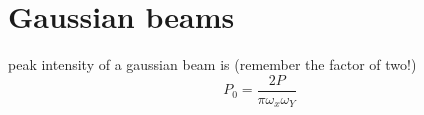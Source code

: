 \documentclass[../../main.tex]{subfiles} %
\begin{document}
\section{Gaussian beams}
peak intensity of a gaussian beam is (remember the factor of two!)
\begin{equation}
    P_0=\frac{2P}{\pi\omega_x\omega_Y}
\end{equation}
\end{document}
